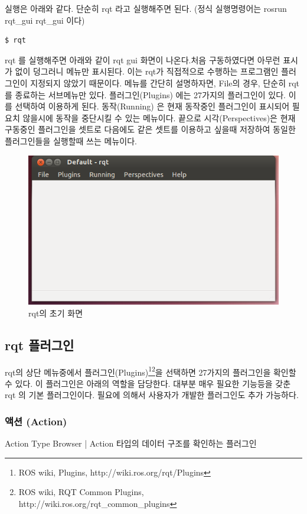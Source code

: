실행은 아래와 같다. 단순히 rqt 라고 실행해주면 된다. (정식 실행명령어는 rosrun rqt\_gui rqt\_gui 이다)

\begin{lstlisting}[language=ROS]
$ rqt
\end{lstlisting}

rqt 를 실행해주면 아래와 같이 rqt gui 화면이 나온다.처음 구동하였다면 아무런 표시가 없이 덩그러니 메뉴만 표시된다. 이는 rqt가 직접적으로 수행하는 프로그램인 플러그인이 지정되지 않았기 때문이다. 메뉴를 간단히 설명하자면, File의 경우, 단순히 rqt를 종료하는 서브메뉴만 있다. 플러그인(Plugins) 에는 27가지의 플러그인이 있다. 이를 선택하여 이용하게 된다. 동작(Running) 은 현재 동작중인 플러그인이 표시되어 필요치 않을시에 동작을 중단시킬 수 있는 메뉴이다. 끝으로 시각(Perspectives)은 현재 구동중인 플러그인을 셋트로 다음에도 같은 셋트를 이용하고 싶을때 저장하여 동일한 플러그인들을 실행할때 쓰는 메뉴이다.

\begin{figure}[h]
\centering\includegraphics[width=0.5\columnwidth]{pictures/chapter6/rqt.png}
\caption{rqt의 초기 화면}
\end{figure}

\subsection{rqt 플러그인}

rqt의 상단 메뉴중에서 플러그인(Plugins)\footnote{ROS wiki, Plugins, http://wiki.ros.org/rqt/Plugins}\footnote{ROS wiki, RQT Common Plugins, http://wiki.ros.org/rqt\_common\_plugins}을 선택하면 27가지의 플러그인을 확인할 수 있다. 이 플러그인은 아래의 역할을 담당한다. 대부분 매우 필요한 기능등을 갖춘 rqt 의 기본 플러그인이다. 필요에 의해서 사용자가 개발한 플러그인도 추가 가능하다.

\subsubsection{액션 (Action)}
Action Type Browser | Action 타입의 데이터 구조를 확인하는 플러그인 
